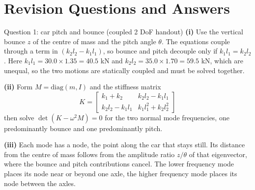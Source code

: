 \documentclass[10pt,a4paper]{article}
\begin{document}
\section{Revision Questions and Answers}

\begin{revisionbox}{Question 1: car pitch and bounce (coupled 2 DoF handout)}
\textbf{(i)} Use the vertical bounce $z$ of the centre of mass and the pitch angle $\theta$. The equations couple through a term in $(k_2 l_2 - k_1 l_1)$, so bounce and pitch decouple only if $k_1 l_1 = k_2 l_2$. Here $k_1 l_1 = 30.0 \times 1.35 = 40.5$ kN and $k_2 l_2 = 35.0 \times 1.70 = 59.5$ kN, which are unequal, so the two motions are statically coupled and must be solved together.

\textbf{(ii)} Form $M = \mathrm{diag}(m, I)$ and the stiffness matrix
\[
  K = \begin{bmatrix} k_1 + k_2 & k_2 l_2 - k_1 l_1 \\ k_2 l_2 - k_1 l_1 & k_1 l_1^2 + k_2 l_2^2 \end{bmatrix}
\]
then solve $\det(K - \omega^2 M) = 0$ for the two normal mode frequencies, one predominantly bounce and one predominantly pitch.

\textbf{(iii)} Each mode has a node, the point along the car that stays still. Its distance from the centre of mass follows from the amplitude ratio $z/\theta$ of that eigenvector, where the bounce and pitch contributions cancel. The lower frequency mode places its node near or beyond one axle, the higher frequency mode places its node between the axles.
\end{revisionbox}
\end{document}
